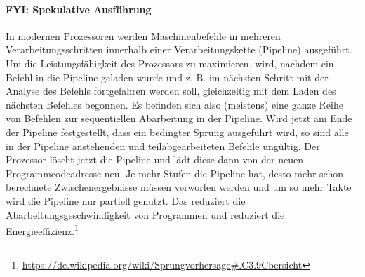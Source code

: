 		\paragraph{FYI: Spekulative Ausführung}
			In modernen Prozessoren werden Maschinenbefehle in mehreren Verarbeitungsschritten innerhalb einer Verarbeitungskette (Pipeline) ausgeführt. Um die Leistungsfähigkeit des Prozessors zu maximieren, wird, nachdem ein Befehl in die Pipeline geladen wurde und z. B. im nächsten Schritt mit der Analyse des Befehls fortgefahren werden soll, gleichzeitig mit dem Laden des nächsten Befehles begonnen. Es befinden sich also (meistens) eine ganze Reihe von Befehlen zur sequentiellen Abarbeitung in der Pipeline. Wird jetzt am Ende der Pipeline festgestellt, dass ein bedingter Sprung ausgeführt wird, so sind alle in der Pipeline anstehenden und teilabgearbeiteten Befehle ungültig. Der Prozessor löscht jetzt die Pipeline und lädt diese dann von der neuen Programmcodeadresse neu. Je mehr Stufen die Pipeline hat, desto mehr schon berechnete Zwischenergebnisse müssen verworfen werden und um so mehr Takte wird die Pipeline nur partiell genutzt. Das reduziert die Abarbeitungsgeschwindigkeit von Programmen und reduziert die Energieeffizienz.\footnote{\url{https://de.wikipedia.org/wiki/Sprungvorhersage\#.C3.9Cbersicht}}
